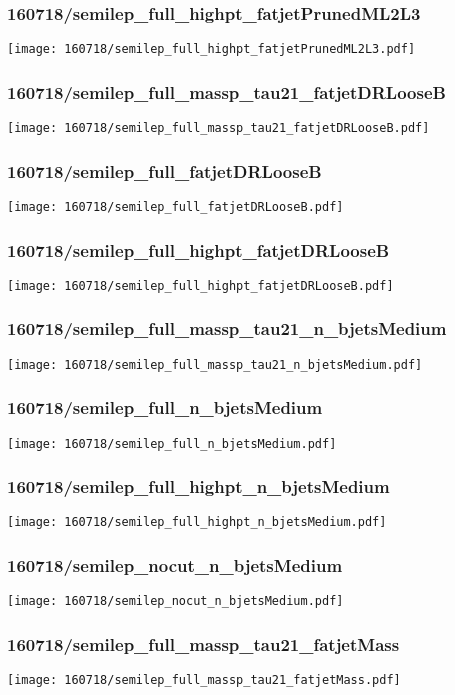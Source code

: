 \begin{frame}
   \frametitle{\small 160718/semilep\_full\_highpt\_fatjetPrunedML2L3}
   \centering
   \texttt{[image: 160718/semilep\_full\_highpt\_fatjetPrunedML2L3.pdf]}
\end{frame}

\begin{frame}
   \frametitle{\small 160718/semilep\_full\_massp\_tau21\_fatjetDRLooseB}
   \centering
   \texttt{[image: 160718/semilep\_full\_massp\_tau21\_fatjetDRLooseB.pdf]}
\end{frame}

\begin{frame}
   \frametitle{\small 160718/semilep\_full\_fatjetDRLooseB}
   \centering
   \texttt{[image: 160718/semilep\_full\_fatjetDRLooseB.pdf]}
\end{frame}

\begin{frame}
   \frametitle{\small 160718/semilep\_full\_highpt\_fatjetDRLooseB}
   \centering
   \texttt{[image: 160718/semilep\_full\_highpt\_fatjetDRLooseB.pdf]}
\end{frame}

\begin{frame}
   \frametitle{\small 160718/semilep\_full\_massp\_tau21\_n\_bjetsMedium}
   \centering
   \texttt{[image: 160718/semilep\_full\_massp\_tau21\_n\_bjetsMedium.pdf]}
\end{frame}

\begin{frame}
   \frametitle{\small 160718/semilep\_full\_n\_bjetsMedium}
   \centering
   \texttt{[image: 160718/semilep\_full\_n\_bjetsMedium.pdf]}
\end{frame}

\begin{frame}
   \frametitle{\small 160718/semilep\_full\_highpt\_n\_bjetsMedium}
   \centering
   \texttt{[image: 160718/semilep\_full\_highpt\_n\_bjetsMedium.pdf]}
\end{frame}

\begin{frame}
   \frametitle{\small 160718/semilep\_nocut\_n\_bjetsMedium}
   \centering
   \texttt{[image: 160718/semilep\_nocut\_n\_bjetsMedium.pdf]}
\end{frame}

\begin{frame}
   \frametitle{\small 160718/semilep\_full\_massp\_tau21\_fatjetMass}
   \centering
   \texttt{[image: 160718/semilep\_full\_massp\_tau21\_fatjetMass.pdf]}
\end{frame}

